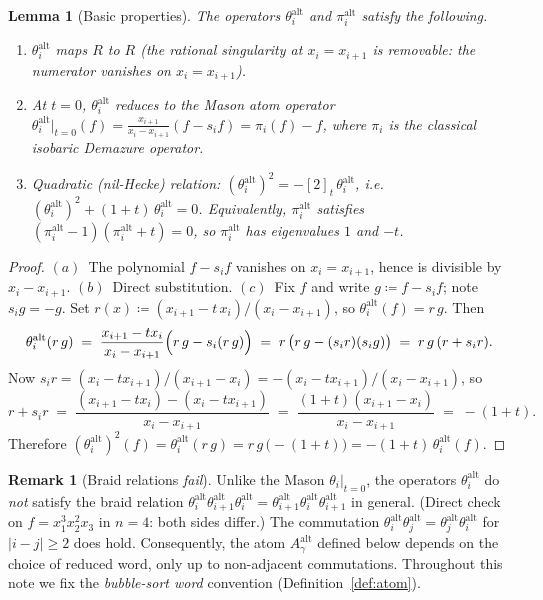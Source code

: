 \documentclass[11pt]{article}
\newtheorem{lemma}[theorem]{Lemma}
\theoremstyle{definition}
\newtheorem{remark}[theorem]{Remark}
\newcommand{\gauss}[1]{[#1]_t}
\newcommand{\Aalt}{A^{\mathrm{alt}}}
\newcommand{\theal}{\theta^{\mathrm{alt}}}
\newcommand{\pial}{\pi^{\mathrm{alt}}}
\begin{document}
\begin{lemma}[Basic properties]
\label{lem:theta_props}
The operators $\theal_i$ and $\pial_i$ satisfy the following.
\begin{enumerate}
\item[$(a)$] $\theal_i$ maps $R$ to $R$ (the rational singularity at $x_i=x_{i+1}$ is
   removable: the numerator vanishes on $x_i=x_{i+1}$).
\item[$(b)$] At $t=0$, $\theal_i$ reduces to the Mason atom operator
   $\theal_i\big|_{t=0}(f) = \frac{x_{i+1}}{x_i-x_{i+1}}(f-s_if) = \pi_i(f) - f$,
   where $\pi_i$ is the classical isobaric Demazure operator.
\item[$(c)$] Quadratic (nil-Hecke) relation: $(\theal_i)^2 = -\gauss{2}\,\theal_i$, i.e.
   $(\theal_i)^2 + (1+t)\,\theal_i = 0$.
   Equivalently, $\pial_i$ satisfies $(\pial_i - 1)(\pial_i + t) = 0$, so
   $\pial_i$ has eigenvalues $1$ and $-t$.
\end{enumerate}
\end{lemma}

\begin{proof}
$(a)$~The polynomial $f-s_if$ vanishes on $x_i=x_{i+1}$, hence is divisible by
$x_i-x_{i+1}$. $(b)$~Direct substitution. $(c)$~Fix $f$ and write $g\coloneqq f-s_if$;
note $s_i g = -g$. Set $r(x)\coloneqq (x_{i+1}-t\,x_i)/(x_i-x_{i+1})$, so
$\theal_i(f)=r\,g$. Then
\[
\theal_i(r\,g) \;=\; \frac{x_{i+1}-t x_i}{x_i-x_{i+1}}\Bigl(r\,g - s_i(r\,g)\Bigr)
              \;=\; r\,\bigl(r\,g - (s_i r)(s_i g)\bigr)
              \;=\; r\,g\,(r + s_i r).
\]
Now $s_i r = (x_i - t x_{i+1})/(x_{i+1}-x_i) = -(x_i - tx_{i+1})/(x_i-x_{i+1})$, so
\[
   r + s_i r
   \;=\; \frac{(x_{i+1}-t x_i) - (x_i - t x_{i+1})}{x_i - x_{i+1}}
   \;=\; \frac{(1+t)(x_{i+1}-x_i)}{x_i-x_{i+1}}
   \;=\; -(1+t).
\]
Therefore $(\theal_i)^2(f)=\theal_i(r\,g)=r\,g\,\bigl(-(1+t)\bigr) = -(1+t)\,\theal_i(f)$.
\qedhere
\end{proof}

\begin{remark}[Braid relations \emph{fail}]
\label{rem:braid_fails}
Unlike the Mason $\theta_i|_{t=0}$, the operators $\theal_i$ do \emph{not} satisfy the
braid relation $\theal_i\theal_{i+1}\theal_i = \theal_{i+1}\theal_i\theal_{i+1}$
in general. (Direct check on $f=x_1^3 x_2^2 x_3$ in $n=4$: both sides differ.) The
commutation $\theal_i\theal_j=\theal_j\theal_i$ for $|i-j|\ge 2$ does hold. Consequently,
the atom $\Aalt_\gamma$ defined below depends on the choice of reduced word, only up to
non-adjacent commutations. Throughout this note we fix the \emph{bubble-sort word}
convention (Definition~\ref{def:atom}).
\end{remark}
\end{document}
